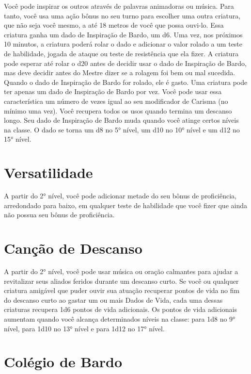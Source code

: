 \documentclass{RPG_Adventure}[2021/10/20]
\begin{document}
Você pode inspirar os outros através de palavras animadoras ou música. Para
tanto, você usa uma ação bônus no seu turno para escolher uma outra criatura,
que não seja você mesmo, a até 18 metros de você que possa ouvi-lo. Essa
criatura ganha um dado de Inspiração de Bardo, um d6.
Uma vez, nos próximos 10 minutos, a criatura poderá rolar o dado e adicionar o
valor rolado a um teste de habilidade, jogada de ataque ou teste de resistência
que ela fizer. A criatura pode esperar até rolar o d20 antes de decidir usar o
dado de Inspiração de Bardo, mas deve decidir antes do Mestre dizer se a rolagem
foi bem ou mal sucedida. Quando o dado de Inspiração de Bardo for rolado, ele é
gasto. Uma criatura pode ter apenas um dado de Inspiração de Bardo por vez.
Você pode usar essa característica um número de vezes igual ao seu modificador
de Carisma (no mínimo uma vez). Você recupera todos os usos quando termina um
descanso longo.
Seu dado de Inspiração de Bardo muda quando você atinge certos níveis na classe.
O dado se torna um d8 no 5° nível, um d10 no 10° nível e um d12 no 15° nível.

\section*{Versatilidade}%

A partir do 2° nível, você pode adicionar metade do seu bônus de proficiência,
arredondado para baixo, em qualquer teste de habilidade que você fizer que ainda
não possua seu bônus de proficiência.

\section*{Canção de Descanso}%

A partir do 2° nível, você pode usar música ou oração calmantes para ajudar a
revitalizar seus aliados feridos durante um descanso curto. Se você ou qualquer
criatura amigável que puder ouvir sua atuação recuperar pontos de vida no fim do
descanso curto ao gastar um ou mais Dados de Vida, cada uma dessas criaturas
recupera 1d6 pontos de vida adicionais.
Os pontos de vida adicionais aumentam quando você alcança determinados níveis na
classe: para 1d8 no 9° nível, para 1d10 no 13° nível e para 1d12 no 17°
nível.

\section*{Colégio de Bardo}%
\end{document}
